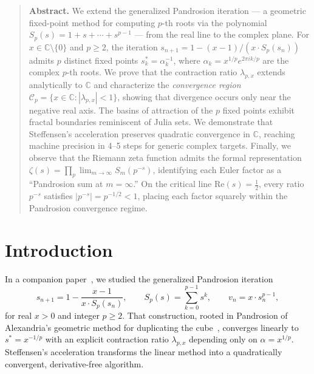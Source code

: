 \documentclass[10pt,a4paper,oneside]{book}
\theoremstyle{definition}
\theoremstyle{remark}
\newenvironment{abstract}{\begin{quote}\small\textbf{Abstract.}}{\end{quote}}
\newcommand{\CC}{\mathbb{C}}
\begin{document}
\begin{abstract}
We extend the generalized Pandrosion iteration --- a geometric fixed-point method for computing $p$-th roots via the polynomial $S_p(s) = 1 + s + \cdots + s^{p-1}$ --- from the real line to the complex plane.  For $x \in \CC \setminus \{0\}$ and $p \geq 2$, the iteration $s_{n+1} = 1 - (x-1)/(x \cdot S_p(s_n))$ admits $p$ distinct fixed points $s_k^* = \alpha_k^{-1}$, where $\alpha_k = x^{1/p} e^{2\pi i k / p}$ are the complex $p$-th roots.  We prove that the contraction ratio $\lambda_{p,x}$ extends analytically to $\CC$ and characterize the \emph{convergence region} $\mathcal{C}_p = \{x \in \CC : |\lambda_{p,x}| < 1\}$, showing that divergence occurs only near the negative real axis.  The basins of attraction of the $p$ fixed points exhibit fractal boundaries reminiscent of Julia sets.  We demonstrate that Steffensen's acceleration preserves quadratic convergence in $\CC$, reaching machine precision in 4--5 steps for generic complex targets.  Finally, we observe that the Riemann zeta function admits the formal representation $\zeta(s) = \prod_p \lim_{m \to \infty} S_m(p^{-s})$, identifying each Euler factor as a ``Pandrosion sum at $m = \infty$.''  On the critical line $\mathrm{Re}(s) = \tfrac{1}{2}$, every ratio $p^{-s}$ satisfies $|p^{-s}| = p^{-1/2} < 1$, placing each factor squarely within the Pandrosion convergence regime.
\end{abstract}

\bigskip

\section{Introduction}

In a companion paper~\cite{besevic2026}, we studied the generalized Pandrosion iteration
\begin{equation}
  \label{eq:pandrosion_real}
  s_{n+1} = 1 - \frac{x-1}{x \cdot S_p(s_n)},
  \qquad
  S_p(s) = \sum_{k=0}^{p-1} s^k,
  \qquad
  v_n = x \cdot s_n^{p-1},
\end{equation}
for real $x > 0$ and integer $p \geq 2$.  That construction, rooted in Pandrosion of Alexandria's geometric method for duplicating the cube~\cite{pappus}, converges linearly to $s^* = x^{-1/p}$ with an explicit contraction ratio $\lambda_{p,x}$ depending only on $\alpha = x^{1/p}$.  Steffensen's acceleration transforms the linear method into a quadratically convergent, derivative-free algorithm.
\end{document}

